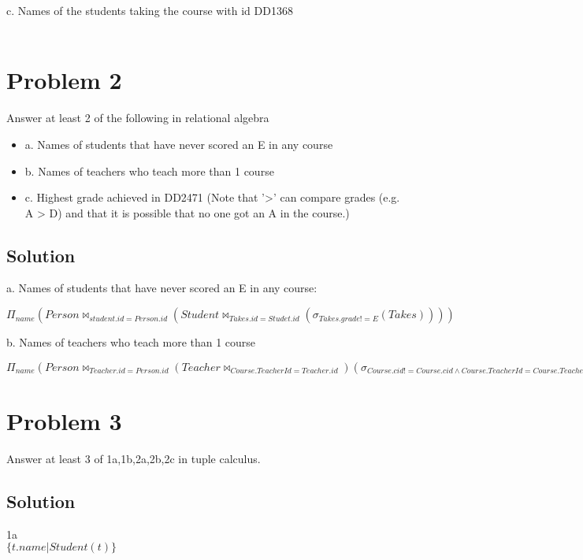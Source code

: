 \documentclass[a4paper]{article}
\begin{document}
c. Names of the students taking the course with id DD1368
\\ \\
\section{Problem 2}
Answer at least 2 of the following in relational algebra
\begin{itemize}
    \item a. Names of students that have never scored an E in any course
    \item b. Names of teachers who teach more than 1 course
    \item c. Highest grade achieved in DD2471 (Note that '>' can compare grades (e.g. A > D) and that it is possible that no one got an A in the course.) 
\end{itemize}
\subsection{Solution}
a. Names of students that have never scored an E in any course:
\begin{center}
   $ \Pi_{name}(Person \bowtie_{student.id = Person.id} (Student \bowtie_{Takes.id = Studet.id}(\sigma_{Takes.grade != E}(Takes) ) ) ) $
\end{center}
b. Names of teachers who teach more than 1 course
\begin{center}
$\Pi_{name}(Person \bowtie_{Teacher.id = Person.id} (Teacher \bowtie_{Course.TeacherId=Teacher.id})(\sigma_{Course.cid!=Course.cid\land Course.TeacherId=Course.TeacherId}(Course) )) $
\end{center}
\section{Problem 3}
Answer at least 3 of 1a,1b,2a,2b,2c in tuple calculus.
\subsection{Solution}
1a \\
$\{ t.name | Student(t) \} $
\end{document}
